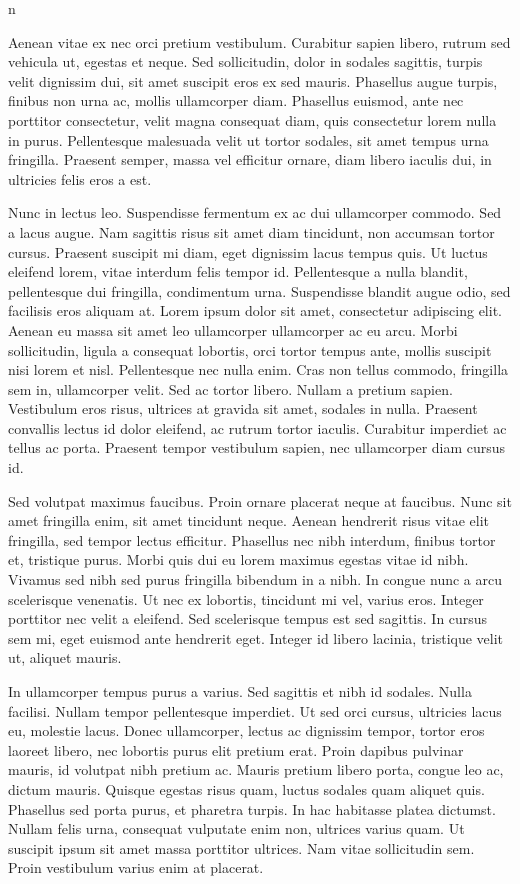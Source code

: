 n\documentclass{report}
\begin{document}
Aenean vitae ex nec orci pretium vestibulum. Curabitur sapien libero, rutrum sed vehicula ut, egestas et neque. Sed sollicitudin, dolor in sodales sagittis, turpis velit dignissim dui, sit amet suscipit eros ex sed mauris. Phasellus augue turpis, finibus non urna ac, mollis ullamcorper diam. Phasellus euismod, ante nec porttitor consectetur, velit magna consequat diam, quis consectetur lorem nulla in purus. Pellentesque malesuada velit ut tortor sodales, sit amet tempus urna fringilla. Praesent semper, massa vel efficitur ornare, diam libero iaculis dui, in ultricies felis eros a est.

Nunc in lectus leo. Suspendisse fermentum ex ac dui ullamcorper commodo. Sed a lacus augue. Nam sagittis risus sit amet diam tincidunt, non accumsan tortor cursus. Praesent suscipit mi diam, eget dignissim lacus tempus quis. Ut luctus eleifend lorem, vitae interdum felis tempor id. Pellentesque a nulla blandit, pellentesque dui fringilla, condimentum urna. Suspendisse blandit augue odio, sed facilisis eros aliquam at.
Lorem ipsum dolor sit amet, consectetur adipiscing elit. Aenean eu massa sit amet leo ullamcorper ullamcorper ac eu arcu. Morbi sollicitudin, ligula a consequat lobortis, orci tortor tempus ante, mollis suscipit nisi lorem et nisl. Pellentesque nec nulla enim. Cras non tellus commodo, fringilla sem in, ullamcorper velit. Sed ac tortor libero. Nullam a pretium sapien. Vestibulum eros risus, ultrices at gravida sit amet, sodales in nulla. Praesent convallis lectus id dolor eleifend, ac rutrum tortor iaculis. Curabitur imperdiet ac tellus ac porta. Praesent tempor vestibulum sapien, nec ullamcorper diam cursus id.

Sed volutpat maximus faucibus. Proin ornare placerat neque at faucibus. Nunc sit amet fringilla enim, sit amet tincidunt neque. Aenean hendrerit risus vitae elit fringilla, sed tempor lectus efficitur. Phasellus nec nibh interdum, finibus tortor et, tristique purus. Morbi quis dui eu lorem maximus egestas vitae id nibh. Vivamus sed nibh sed purus fringilla bibendum in a nibh. In congue nunc a arcu scelerisque venenatis. Ut nec ex lobortis, tincidunt mi vel, varius eros. Integer porttitor nec velit a eleifend. Sed scelerisque tempus est sed sagittis. In cursus sem mi, eget euismod ante hendrerit eget. Integer id libero lacinia, tristique velit ut, aliquet mauris.

In ullamcorper tempus purus a varius. Sed sagittis et nibh id sodales. Nulla facilisi. Nullam tempor pellentesque imperdiet. Ut sed orci cursus, ultricies lacus eu, molestie lacus. Donec ullamcorper, lectus ac dignissim tempor, tortor eros laoreet libero, nec lobortis purus elit pretium erat. Proin dapibus pulvinar mauris, id volutpat nibh pretium ac. Mauris pretium libero porta, congue leo ac, dictum mauris. Quisque egestas risus quam, luctus sodales quam aliquet quis. Phasellus sed porta purus, et pharetra turpis. In hac habitasse platea dictumst. Nullam felis urna, consequat vulputate enim non, ultrices varius quam. Ut suscipit ipsum sit amet massa porttitor ultrices. Nam vitae sollicitudin sem. Proin vestibulum varius enim at placerat.
\end{document}
